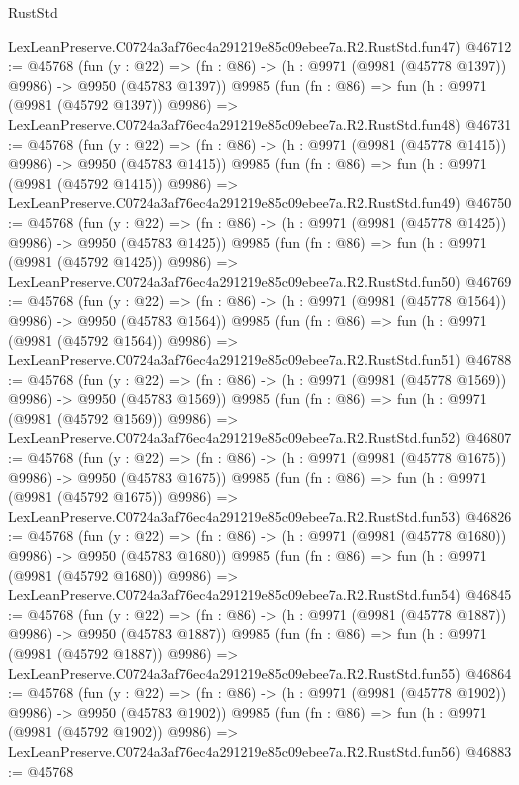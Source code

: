 \begin{lexlean}{RustStd}
\begin{coremodule}
    LexLeanPreserve.C0724a3af76ec4a291219e85c09ebee7a.R2.RustStd.fun47)
@46712 := @45768
    (fun (y : @22) =>
    (fn : @86) -> (h : @9971 (@9981 (@45778 @1397)) @9986) -> @9950 (@45783 @1397))
    @9985
    (fun (fn : @86) =>
    fun (h : @9971 (@9981 (@45792 @1397)) @9986) =>
    LexLeanPreserve.C0724a3af76ec4a291219e85c09ebee7a.R2.RustStd.fun48)
@46731 := @45768
    (fun (y : @22) =>
    (fn : @86) -> (h : @9971 (@9981 (@45778 @1415)) @9986) -> @9950 (@45783 @1415))
    @9985
    (fun (fn : @86) =>
    fun (h : @9971 (@9981 (@45792 @1415)) @9986) =>
    LexLeanPreserve.C0724a3af76ec4a291219e85c09ebee7a.R2.RustStd.fun49)
@46750 := @45768
    (fun (y : @22) =>
    (fn : @86) -> (h : @9971 (@9981 (@45778 @1425)) @9986) -> @9950 (@45783 @1425))
    @9985
    (fun (fn : @86) =>
    fun (h : @9971 (@9981 (@45792 @1425)) @9986) =>
    LexLeanPreserve.C0724a3af76ec4a291219e85c09ebee7a.R2.RustStd.fun50)
@46769 := @45768
    (fun (y : @22) =>
    (fn : @86) -> (h : @9971 (@9981 (@45778 @1564)) @9986) -> @9950 (@45783 @1564))
    @9985
    (fun (fn : @86) =>
    fun (h : @9971 (@9981 (@45792 @1564)) @9986) =>
    LexLeanPreserve.C0724a3af76ec4a291219e85c09ebee7a.R2.RustStd.fun51)
@46788 := @45768
    (fun (y : @22) =>
    (fn : @86) -> (h : @9971 (@9981 (@45778 @1569)) @9986) -> @9950 (@45783 @1569))
    @9985
    (fun (fn : @86) =>
    fun (h : @9971 (@9981 (@45792 @1569)) @9986) =>
    LexLeanPreserve.C0724a3af76ec4a291219e85c09ebee7a.R2.RustStd.fun52)
@46807 := @45768
    (fun (y : @22) =>
    (fn : @86) -> (h : @9971 (@9981 (@45778 @1675)) @9986) -> @9950 (@45783 @1675))
    @9985
    (fun (fn : @86) =>
    fun (h : @9971 (@9981 (@45792 @1675)) @9986) =>
    LexLeanPreserve.C0724a3af76ec4a291219e85c09ebee7a.R2.RustStd.fun53)
@46826 := @45768
    (fun (y : @22) =>
    (fn : @86) -> (h : @9971 (@9981 (@45778 @1680)) @9986) -> @9950 (@45783 @1680))
    @9985
    (fun (fn : @86) =>
    fun (h : @9971 (@9981 (@45792 @1680)) @9986) =>
    LexLeanPreserve.C0724a3af76ec4a291219e85c09ebee7a.R2.RustStd.fun54)
@46845 := @45768
    (fun (y : @22) =>
    (fn : @86) -> (h : @9971 (@9981 (@45778 @1887)) @9986) -> @9950 (@45783 @1887))
    @9985
    (fun (fn : @86) =>
    fun (h : @9971 (@9981 (@45792 @1887)) @9986) =>
    LexLeanPreserve.C0724a3af76ec4a291219e85c09ebee7a.R2.RustStd.fun55)
@46864 := @45768
    (fun (y : @22) =>
    (fn : @86) -> (h : @9971 (@9981 (@45778 @1902)) @9986) -> @9950 (@45783 @1902))
    @9985
    (fun (fn : @86) =>
    fun (h : @9971 (@9981 (@45792 @1902)) @9986) =>
    LexLeanPreserve.C0724a3af76ec4a291219e85c09ebee7a.R2.RustStd.fun56)
@46883 := @45768

\end{coremodule}
\end{lexlean}
